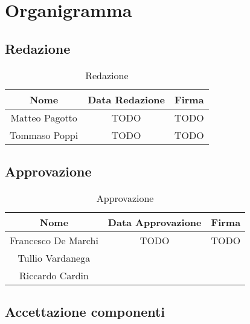 \section{Organigramma}

\subsection{Redazione}

\renewcommand{\arraystretch}{1}
	\begin{table}[H]
		\begin{center}
			\setlength{\aboverulesep}{0pt}
			\setlength{\belowrulesep}{0pt}
			\setlength{\extrarowheight}{.75ex}
			\begin{tabular}{ c c c }
				\rowcolor{AzzuroGruppo!30} 
				\textbf{Nome} & \textbf{Data Redazione} & \textbf{Firma} \\
				\toprule
				Matteo Pagotto & TODO & TODO \\
                Tommaso Poppi & TODO & TODO \\
				\bottomrule
			\end{tabular}
			\caption{Redazione}
		\end{center}
	\end{table}

\subsection{Approvazione}

\renewcommand{\arraystretch}{1}
	\begin{table}[H]
		\begin{center}
			\setlength{\aboverulesep}{0pt}
			\setlength{\belowrulesep}{0pt}
			\setlength{\extrarowheight}{.75ex}
			\begin{tabular}{ c c c}
				\rowcolor{AzzuroGruppo!30} 
				\textbf{Nome} & \textbf{Data Approvazione} & \textbf{Firma} \\
				\toprule
				Francesco De Marchi & TODO & TODO \\
                Tullio Vardanega & & \\
                Riccardo Cardin & & \\
				\bottomrule
			\end{tabular}
			\caption{Approvazione}
		\end{center}
    \end{table}

\subsection{Accettazione componenti}

